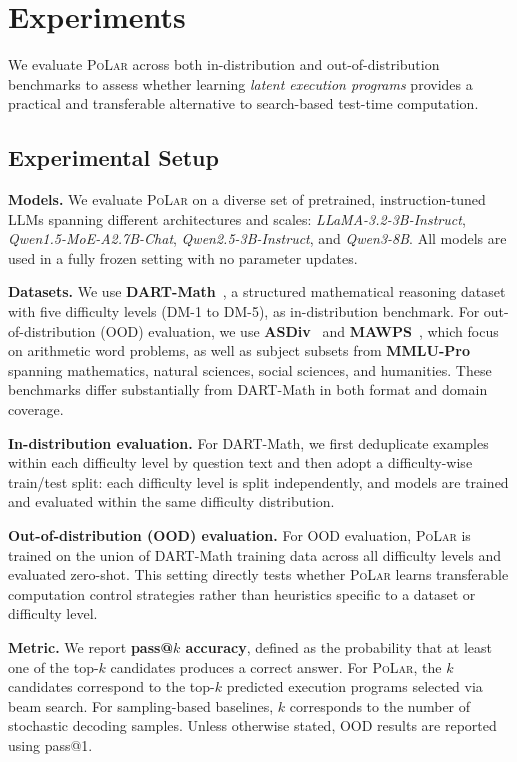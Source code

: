 \documentclass{article}
\theoremstyle{plain}
\theoremstyle{definition}
\theoremstyle{remark}
\newcommand\ours{\textsc{PoLar}\xspace}
\begin{document}
\section{Experiments}

We evaluate \ours across both in-distribution and out-of-distribution benchmarks to assess whether learning \emph{latent execution programs} provides a practical and transferable alternative to search-based test-time computation.



\subsection{Experimental Setup}

\textbf{Models.}
We evaluate \ours on a diverse set of pretrained, instruction-tuned LLMs spanning different architectures and scales: \textit{LLaMA-3.2-3B-Instruct}, \textit{Qwen1.5-MoE-A2.7B-Chat}, \textit{Qwen2.5-3B-Instruct}, and \textit{Qwen3-8B}.
All models are used in a fully frozen setting with no parameter updates.

\textbf{Datasets.}
We use \textbf{DART-Math}~\cite{tong2024dart}, a structured mathematical reasoning dataset with five difficulty levels (DM-1 to DM-5), as in-distribution benchmark.
For out-of-distribution (OOD) evaluation, we use \textbf{ASDiv}~\cite{miao2020diverse} and \textbf{MAWPS}~\cite{kadlvcik2023calc}, which focus on arithmetic word problems, as well as subject subsets from \textbf{MMLU-Pro}~\cite{wang2024mmlu} spanning mathematics, natural sciences, social sciences, and humanities.
These benchmarks differ substantially from DART-Math in both format and domain coverage.

\textbf{In-distribution evaluation.}
For DART-Math, we first deduplicate examples within each difficulty level by question text and then adopt a difficulty-wise train/test split: each difficulty level is split independently, and models are trained and evaluated within the same difficulty distribution.

\textbf{Out-of-distribution (OOD) evaluation.}
For OOD evaluation, \ours is trained on the union of DART-Math training data across all difficulty levels and evaluated zero-shot.
This setting directly tests whether \ours learns transferable computation control strategies rather than heuristics specific to a dataset or difficulty level.

\textbf{Metric.}
We report \textbf{pass@$k$ accuracy}, defined as the probability that at least one of the top-$k$ candidates produces a correct answer.
For \ours, the $k$ candidates correspond to the top-$k$ predicted execution programs selected via beam search.
For sampling-based baselines, $k$ corresponds to the number of stochastic decoding samples.
Unless otherwise stated, OOD results are reported using pass@1.
\end{document}

